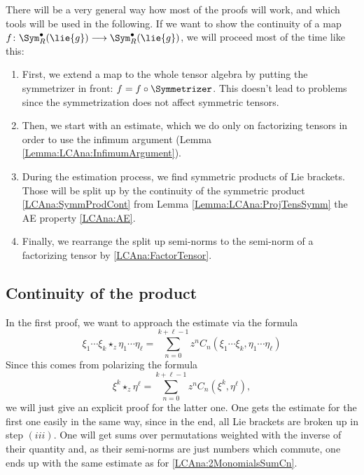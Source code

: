 There will be a very general way how most of the proofs will work, and which 
tools will be used in the following. If we want to show the continuity of a 
map $f \colon \Sym_R^{\bullet}(\lie{g}) \longrightarrow 
\Sym_R^{\bullet}(\lie{g})$, we will proceed most of the time like this:
\begin{enumerate}
	\item \label{Item:LCAna:Step1}
	First, we extend a map to the whole tensor algebra by putting the 
	symmetrizer in front: $f = f \circ \Symmetrizer$. This doesn't lead 
	to problems since the symmetrization does not affect symmetric tensors.

	\item \label{Item:LCAna:Step2}
	Then, we start with an estimate, which we do only on 
	factorizing tensors in order to use the infimum argument 
	(Lemma \ref{Lemma:LCAna:InfimumArgument}).

	\item \label{Item:LCAna:Step3}
	During the estimation process, we find symmetric products of Lie 
	brackets. Those will be split up by the continuity of the symmetric 
	product \eqref{LCAna:SymmProdCont} from Lemma 
	\ref{Lemma:LCAna:ProjTensSymm} the AE property \eqref{LCAna:AE}.
	
	\item \label{Item:LCAna:Step4}
	Finally, we rearrange the split up semi-norms to the semi-norm of a 
	factorizing tensor by \eqref{LCAna:FactorTensor}.
\end{enumerate}


\subsection{Continuity of the product}
In the first proof, we want to approach the estimate via the formula
\begin{equation*}
    \xi_1 \cdots \xi_k \star_z \eta_1 \cdots \eta_{\ell}
    =
    \sum\limits_{n=0}^{k + \ell -1}
    z^n
    C_n (\xi_1 \cdots \xi_k, \eta_1 \cdots \eta_{\ell})
\end{equation*}
Since this comes from polarizing the formula
\begin{equation}
    \label{LCAna:2MonomialsSumCn}
    \xi^k \star_z \eta^{\ell}
    =
    \sum\limits_{n=0}^{k + \ell -1}
    z^n
    C_n \left( \xi^k, \eta^{\ell} \right),
\end{equation}
we will just give an explicit proof for the latter one. One gets the
estimate for the first one easily in the same way, since in the end,
all Lie brackets are broken up in step $(iii)$. One will get 
sums over permutations weighted with the inverse of their quantity and, as 
their semi-norms are just numbers which commute, one ends up with the same 
estimate as for \eqref{LCAna:2MonomialsSumCn}. 

